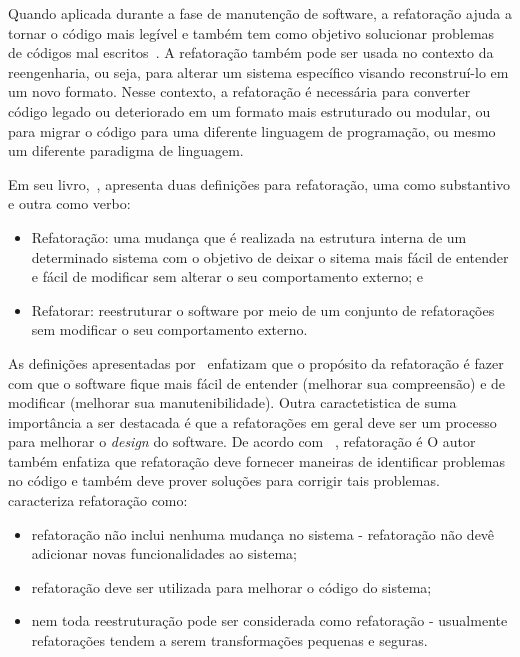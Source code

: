 Quando aplicada durante a fase de manutenção de software, a refatoração ajuda a tornar o código mais legível e também tem como objetivo solucionar problemas de códigos mal escritos~\cite{Chikofsky_cross}. A refatoração também pode ser usada no contexto da reengenharia, ou seja, para alterar um sistema específico visando reconstruí-lo em um novo formato. Nesse contexto, a refatoração é necessária para converter código legado ou deteriorado em um formato mais estruturado ou modular, ou para migrar o código para uma diferente linguagem de programação, ou mesmo um diferente paradigma de linguagem.

Em seu livro,~, apresenta duas definições para refatoração, uma como substantivo e outra como verbo:

\begin{itemize}
	\item Refatoração: uma mudança que é realizada na estrutura interna de um determinado sistema com o objetivo de deixar o sitema mais fácil de entender e fácil de modificar sem alterar o seu comportamento externo; e
	\item Refatorar: reestruturar o software por meio de um conjunto de refatorações sem modificar o seu comportamento externo.
\end{itemize}

As definições apresentadas por~ enfatizam que o propósito da refatoração é fazer com que o software fique mais fácil de entender (melhorar sua compreensão) e de modificar (melhorar sua manutenibilidade). Outra caractetistica de suma importância a ser destacada é que a refatorações em geral deve ser um processo para melhorar o \textit{design} do software. De acordo com~ , refatoração é  O autor também enfatiza que refatoração deve fornecer maneiras de identificar problemas no código e também deve prover soluções para corrigir tais problemas.~ caracteriza refatoração como:

\begin{itemize}
	\item refatoração não inclui nenhuma mudança no sistema - refatoração não devê adicionar novas funcionalidades ao sistema;
	\item refatoração deve ser utilizada para melhorar o código do sistema;
	\item nem toda reestruturação pode ser considerada como refatoração - usualmente refatorações tendem a serem transformações pequenas e seguras. 
\end{itemize}

